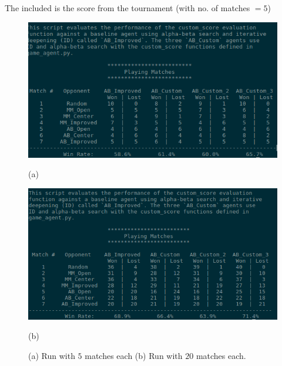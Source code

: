 \documentclass[11pt]{article}
\begin{document}
\begin{itemize}
The included is the score from the tournament (with no. of matches $=5$)
\begin{figure}[htb] 
\begin{minipage}[b]{0.48\linewidth}
  \centering
  \centerline{\includegraphics[scale=0.35]{result_1.png}}
  \centerline{\footnotesize{(a)}}
\end{minipage}
\hfill
\begin{minipage}[b]{0.48\linewidth}
  \centering
  \centerline{\includegraphics[scale=0.35]{result_3.png}}
 \centerline{\footnotesize{(b) }}
\end{minipage}\vspace{-10pt}
\caption{(a) Run with $5$ matches each (b) Run with $20$ matches each. }
\label{fig:pred-acc}
\end{figure}
\end{itemize}
\end{document}
